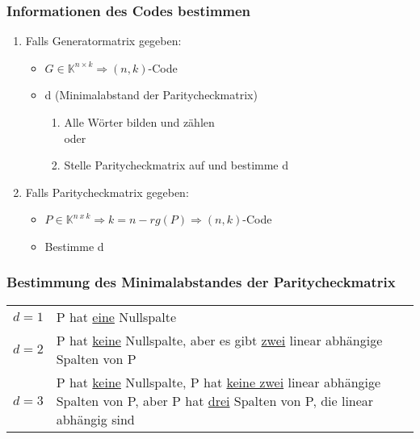 \documentclass{scrartcl}
\begin{document}
\subsubsection{Informationen des Codes bestimmen}
    \begin{enumerate}
    \item Falls Generatormatrix gegeben:
        \begin{itemize}
        \item $G \in \mathbb{K}^{n \times k} \Rightarrow (n,k)$-Code
        \item d (Minimalabstand der Paritycheckmatrix)
            \begin{enumerate}
            \item Alle Wörter bilden und zählen\\
            oder
            \item Stelle Paritycheckmatrix auf und bestimme d
            \end{enumerate}
        \end{itemize}
    \item Falls Paritycheckmatrix gegeben:
        \begin{itemize}
        \item $P \in \mathbb{K}^{n~x~k} \Rightarrow k = n -rg(P) \Rightarrow (n,k)$-Code
        \item Bestimme d
        \end{itemize}
    \end{enumerate}


\subsubsection{Bestimmung des Minimalabstandes der Paritycheckmatrix}

\begin{tabular}{p{}p{}}
$d = 1$ & P hat \underline{eine} Nullspalte \\
$d = 2$ & P hat \underline{keine} Nullspalte, aber es gibt \underline{zwei} linear abhängige Spalten von P\\
$d = 3$ & P hat \underline{keine} Nullspalte, P hat  \underline{keine zwei} linear abhängige Spalten von P, aber P hat \underline{drei} Spalten von P, die linear abhängig sind\\
\end{tabular}
\end{document}
